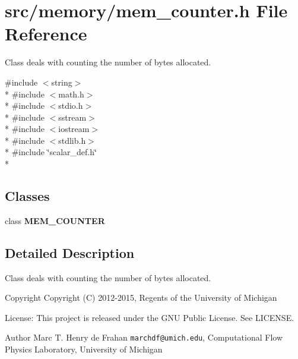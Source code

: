 \section{src/memory/mem\-\_\-counter.h File Reference}
\label{mem__counter_8h}


Class deals with counting the number of bytes allocated.  


{\ttfamily \#include $<$string$>$}\\*
{\ttfamily \#include $<$math.\-h$>$}\\*
{\ttfamily \#include $<$stdio.\-h$>$}\\*
{\ttfamily \#include $<$sstream$>$}\\*
{\ttfamily \#include $<$iostream$>$}\\*
{\ttfamily \#include $<$stdlib.\-h$>$}\\*
{\ttfamily \#include \char`\"{}scalar\-\_\-def.\-h\char`\"{}}\\*
\subsection*{Classes}
\begin{DoxyCompactItemize}
\item 
class {\bf M\-E\-M\-\_\-\-C\-O\-U\-N\-T\-E\-R}
\end{DoxyCompactItemize}


\subsection{Detailed Description}
Class deals with counting the number of bytes allocated. \begin{DoxyCopyright}{Copyright}
Copyright (C) 2012-\/2015, Regents of the University of Michigan 
\end{DoxyCopyright}
\begin{DoxyParagraph}{License\-:}
This project is released under the G\-N\-U Public License. See L\-I\-C\-E\-N\-S\-E. 
\end{DoxyParagraph}
\begin{DoxyAuthor}{Author}
Marc T. Henry de Frahan {\tt marchdf@umich.\-edu}, Computational Flow Physics Laboratory, University of Michigan 
\end{DoxyAuthor}
